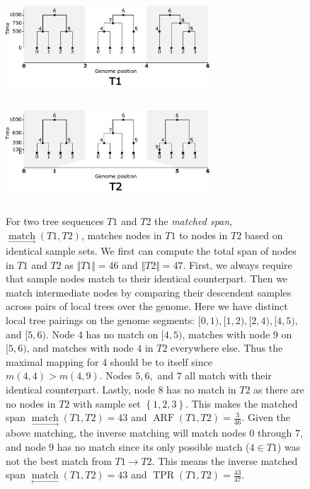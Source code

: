 \documentclass[10pt,twoside,lineno]{gsajnl}
\newcommand{\match}{\underset{\longrightarrow}{\operatorname{match}}}
\newcommand{\invmatch}{\underset{\longleftarrow}{\operatorname{match}}}
\begin{document}
\begin{figure}[!ht]
	\begin{center}
\includegraphics[height=1.5in, width=3in]{figures/discrepancy_func_method_t1.pdf}
\includegraphics[height=1.5in, width=3in]{figures/discrepancy_function_method_t2.pdf}
    \caption{
        For two tree sequences $T1$ and $T2$ the \emph{matched span}, $\match(T1,T2)$, matches nodes in $T1$ to nodes in $T2$
        based on identical sample sets. We first can compute the total span of nodes in $T1$ and $T2$ as $\Vert T1\Vert = 46$ and $\Vert T2\Vert = 47$.
        First, we always require that sample nodes match to their identical counterpart. Then we match intermediate nodes by comparing their
        descendent samples across pairs of local trees over the genome. Here we have distinct local tree pairings on the genome segments:
        $[0,1), [1,2), [2,4), [4,5),$ and $[5,6)$.
        Node $4$ has no match on $[4,5)$, matches with node $9$ on $[5,6)$, and matches with node $4$ in $T2$ everywhere else. 
        Thus the maximal mapping for 4 should be to itself since $m(4,4) > m(4,9)$. 
        Nodes $5, 6,$ and $7$ all match with their identical counterpart.
        Lastly, node $8$ has no match in $T2$ as there are no nodes in $T2$ with sample set $\left\{1,2,3\right\}$.
        This makes the matched span $\match(T1,T2)=43$ and $\operatorname{ARF}(T1,T2)=\frac{3}{46}$.
        Given the above matching, the inverse matching will match nodes $0$ through $7$, and node $9$ has no match 
        since its only possible match ($4 \in T1$) was not the best match from $T1 \to T2$. 
        This means the inverse matched span $\invmatch(T1,T2)=43$ and $\operatorname{TPR}(T1,T2)=\frac{43}{47}$.\newline
}
\end{center}
\end{figure}
\end{document}
